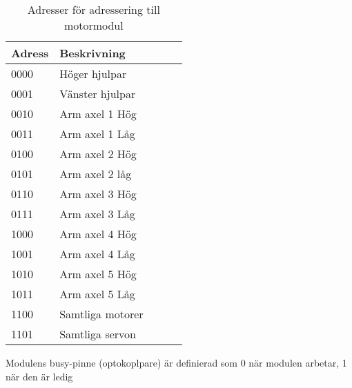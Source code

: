 \begin{table}[h]
	\centering
		\begin{tabularx}{\textwidth}{| l | l | X | l | l |}
			\hline
			\textbf{Adress} & \textbf{Beskrivning} \\
			\hline
			{0000} & {Höger hjulpar} \\
			\hline
			{0001} & {Vänster hjulpar} \\
			\hline
			{0010} & {Arm axel 1 Hög} \\ %
			\hline
			{0011} & {Arm axel 1 Låg} \\
			\hline
			{0100} & {Arm axel 2 Hög} \\
			\hline
			{0101} & {Arm axel 2 låg} \\
			\hline
			{0110} & {Arm axel 3 Hög} \\
			\hline
			{0111} & {Arm axel 3 Låg} \\
			\hline
			{1000} & {Arm axel 4 Hög} \\
			\hline
			{1001} & {Arm axel 4 Låg} \\
			\hline
			{1010} & {Arm axel 5 Hög} \\
			\hline
			{1011} & {Arm axel 5 Låg} \\ %
			\hline
			{1100} & {Samtliga motorer} \\
			\hline
			{1101} & {Samtliga servon} \\
			\hline
		\end{tabularx}
	\caption{Adresser för adressering till motormodul} \label{protokoll:pc-motor-adress}
\end{table}

Modulens busy-pinne (optokoplpare) är definierad som 0 när modulen arbetar, 1 när den är ledig
